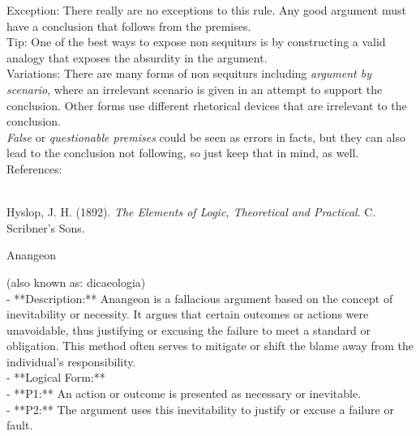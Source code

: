\documentclass[a4paper,12pt,single,pdftex]{scrbook}
\begin{document}
{    
      Exception: There really are no exceptions to this rule. Any good argument must have a conclusion that follows from the premises.
    \\

    
      Tip: One of the best ways to expose non sequiturs is by constructing a valid analogy that exposes the absurdity in the argument.
    \\

    
      Variations: There are many forms of non sequiturs including {\it argument by scenario}, where an irrelevant scenario is given in an attempt to support the conclusion.  Other forms use different rhetorical devices that are irrelevant to the conclusion.
    \\

    
      {\it False} or {\it questionable premises} could be seen as errors in facts, but they can also lead to the conclusion not following, so just keep that in mind, as well.
    \\

    References:

    
      
        
      \\

      
        
          Hyslop, J. H. (1892). {\it The Elements of Logic, Theoretical and Practical}. C. Scribner’s Sons.
        
      
    
  }


Anangeon
    
      (also known as: dicaeologia)
    \\

  
    
      - **Description:** Anangeon is a fallacious argument based on the concept of inevitability or necessity. It argues that certain outcomes or actions were unavoidable, thus justifying or excusing the failure to meet a standard or obligation. This method often serves to mitigate or shift the blame away from the individual’s responsibility.
    \\

    
      - **Logical Form:**
    \\

    
        - **P1:** An action or outcome is presented as necessary or inevitable.
    \\

    
        - **P2:** The argument uses this inevitability to justify or excuse a failure or fault.
    \\
\end{document}
